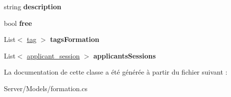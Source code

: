 \begin{DoxyCompactItemize}
\item 
\mbox{\label{class_server_1_1_models_1_1formation_a169f15e3730d563578884fae18411ee7}} 
string {\bfseries description}
\item 
\mbox{\label{class_server_1_1_models_1_1formation_a23f0ff9cbe173f777dcb6525667106f1}} 
bool {\bfseries free}
\item 
\mbox{\label{class_server_1_1_models_1_1formation_a31037690b47204a2cde5e12fa0efefd1}} 
List$<$ \hyperlink{class_server_1_1_models_1_1tag}{tag} $>$ {\bfseries tags\+Formation}
\item 
\mbox{\label{class_server_1_1_models_1_1formation_ace7df689069b11d8e55b49ea85dd038b}} 
List$<$ \hyperlink{class_server_1_1_models_1_1applicant__session}{applicant\+\_\+session} $>$ {\bfseries applicants\+Sessions}
\end{DoxyCompactItemize}


La documentation de cette classe a été générée à partir du fichier suivant \+:\begin{DoxyCompactItemize}
\item 
Server/\+Models/formation.\+cs\end{DoxyCompactItemize}

